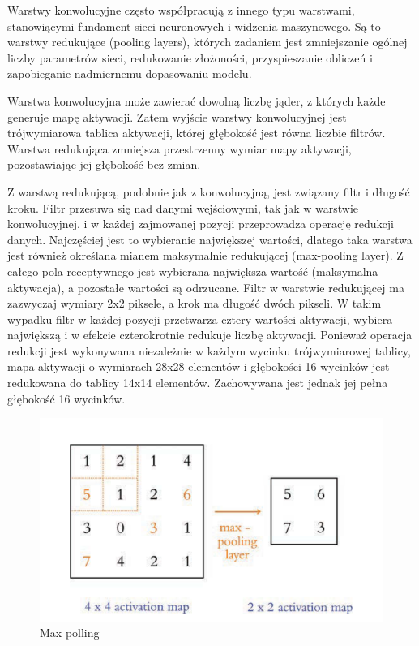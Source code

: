 \documentclass[12pt]{mwbk}
\theoremstyle{plain}
\theoremstyle{definition}
\theoremstyle{remark}
\newcommand\zrodlo[1]{\par\vspace{-3mm}{\small\textit{Źródło: }#1 }}
\begin{document}
	\cite{illustrated}
	
	Warstwy konwolucyjne często współpracują z innego typu warstwami, stanowiącymi fundament sieci neuronowych i widzenia maszynowego. Są to warstwy redukujące (pooling layers), których zadaniem jest zmniejszanie ogólnej liczby parametrów sieci, redukowanie złożoności, przyspieszanie obliczeń i zapobieganie nadmiernemu dopasowaniu modelu.
	
	Warstwa konwolucyjna może zawierać dowolną liczbę jąder, z których każde generuje mapę aktywacji. Zatem wyjście warstwy konwolucyjnej jest trójwymiarowa tablica aktywacji, której głębokość jest równa liczbie filtrów. Warstwa redukująca zmniejsza przestrzenny wymiar mapy aktywacji, pozostawiając jej głębokość bez zmian.
	
	Z warstwą redukującą, podobnie jak z konwolucyjną, jest związany filtr i długość kroku. Filtr przesuwa się nad danymi wejściowymi, tak jak w warstwie konwolucyjnej, i w każdej zajmowanej pozycji przeprowadza operację redukcji danych. Najczęściej jest to wybieranie największej wartości, dlatego taka warstwa jest również określana mianem maksymalnie redukującej (max-pooling layer). Z całego pola receptywnego jest wybierana największa wartość (maksymalna aktywacja), a pozostałe wartości są odrzucane. Filtr w warstwie redukującej ma zazwyczaj wymiary 2x2 piksele, a krok ma długość dwóch pikseli. W takim wypadku filtr w każdej pozycji przetwarza cztery wartości aktywacji, wybiera największą i w efekcie czterokrotnie redukuje liczbę aktywacji. Ponieważ operacja redukcji jest wykonywana niezależnie w każdym wycinku trójwymiarowej tablicy, mapa aktywacji o wymiarach 28x28 elementów i głębokości 16 wycinków jest redukowana do tablicy 14x14 elementów. Zachowywana jest jednak jej pełna głębokość 16 wycinków.
	
	\begin{figure}[!h]
		\centering
		\includegraphics[width=\linewidth]{rys/max-polling.png}
		\caption{Max polling}
		\zrodlo{\cite{illustrated}}
		\label{fig:max-polling}
	\end{figure}
	
\end{document}
